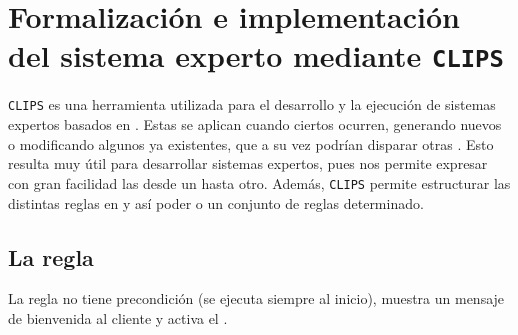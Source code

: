 % 

\section{Formalización e implementación del sistema experto mediante \texttt{CLIPS}}

\texttt{CLIPS} es una herramienta utilizada para el desarrollo y la ejecución de sistemas expertos basados en .
Estas  se aplican cuando ciertos  ocurren, generando nuevos  o modificando algunos ya existentes, que a su vez podrían disparar otras . Esto resulta muy útil para desarrollar sistemas expertos,
pues nos permite expresar con gran facilidad las  desde un  hasta otro.
Además, \texttt{CLIPS} permite estructurar las distintas reglas en  y así poder  o  un
conjunto de reglas determinado.

\subsection{La regla }
La regla  no tiene precondición (se ejecuta siempre al inicio), muestra un mensaje de bienvenida al cliente y activa el
.





